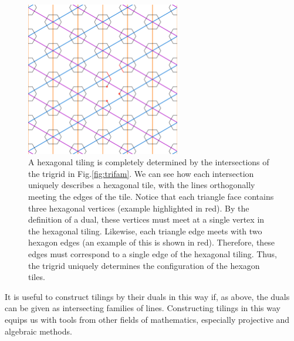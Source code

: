 \documentclass[
  oneside,
  11pt, a4paper,
  footinclude=true,
  headinclude=true,
  cleardoublepage=empty
]{scrbook}
\begin{document}
\begin{figure}[H]
\centering
\includegraphics[width=0.6\textwidth]{HexagonDualSmall}
\caption[Hexagons Defined by Trigrid Intersections]{A hexagonal tiling is completely determined by the intersections of the trigrid in Fig.\ref{fig:trifam}. We can see how each intersection uniquely describes a hexagonal tile, with the lines orthogonally meeting the edges of the tile. Notice that each triangle face contains three hexagonal vertices (example highlighted in red). By the definition of a dual, these vertices must meet at a single vertex in the hexagonal tiling. Likewise, each triangle edge meets with two hexagon edges (an example of this is shown in red). Therefore, these edges must correspond to a single edge of the hexagonal tiling. Thus, the trigrid uniquely determines the configuration of the hexagon tiles.}
\label{fig:hexsmall}
\end{figure}

It is useful to construct tilings by their duals in this way if, as above, the duals can be given as intersecting families of lines. Constructing tilings in this way equips us with tools from other fields of mathematics, especially projective and algebraic methods.
\end{document}
